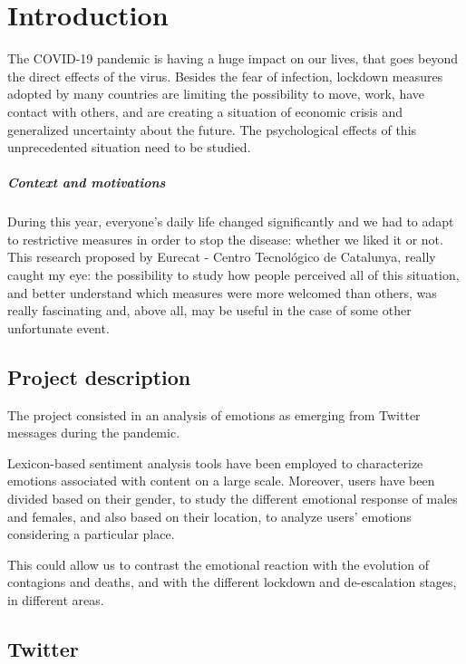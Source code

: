 \chapter{Introduction}
\label{cha:intro}

The COVID-19 pandemic is having a huge impact on our lives, that goes beyond the direct effects of the virus. Besides the fear of infection, lockdown measures adopted by many countries are limiting the possibility to move, work, have contact with others, and are creating a situation of economic crisis and generalized uncertainty about the future. The psychological effects of this unprecedented situation need to be studied.

\paragraph{Context and motivations}

During this year, everyone's daily life changed significantly and we had to adapt to restrictive measures in order to stop the disease: whether we liked it or not. This research proposed by Eurecat - Centro Tecnológico de Catalunya, really caught my eye: the possibility to study how people perceived all of this situation, and better understand which measures were more welcomed than others, was really fascinating and, above all, may be useful in the case of some other unfortunate event.

\section{Project description}
\label{sec:project}

The project consisted in an analysis of emotions as emerging from Twitter messages during the pandemic.

Lexicon-based sentiment analysis tools have been employed to characterize emotions associated with content on a large scale. Moreover, users have been divided based on their gender, to study the different emotional response of males and females, and also based on their location, to analyze users' emotions considering a particular place. 

This could allow us to contrast the emotional reaction with the evolution of contagions and deaths, and with the different lockdown and de-escalation stages, in different areas.

\section{Twitter}
\label{sec:twitter}

